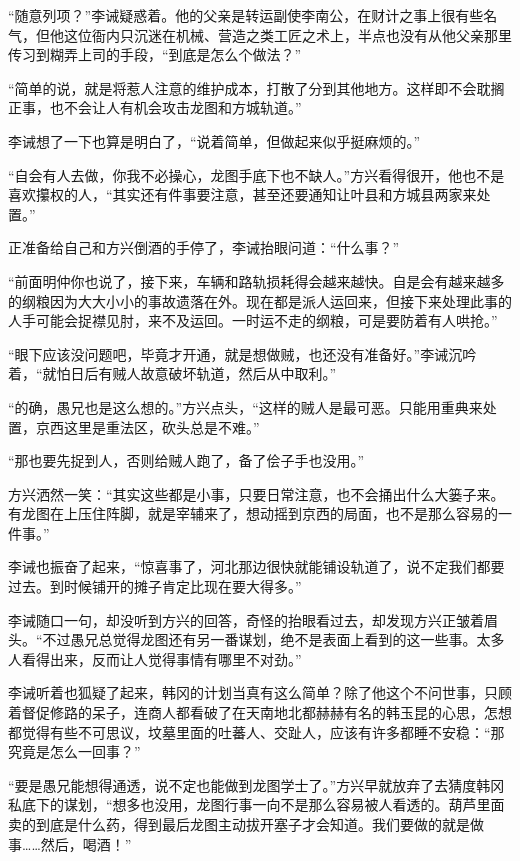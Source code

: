 “随意列项？”李诫疑惑着。他的父亲是转运副使李南公，在财计之事上很有些名气，但他这位衙内只沉迷在机械、营造之类工匠之术上，半点也没有从他父亲那里传习到糊弄上司的手段，“到底是怎么个做法？”

“简单的说，就是将惹人注意的维护成本，打散了分到其他地方。这样即不会耽搁正事，也不会让人有机会攻击龙图和方城轨道。”

李诫想了一下也算是明白了，“说着简单，但做起来似乎挺麻烦的。”

“自会有人去做，你我不必操心，龙图手底下也不缺人。”方兴看得很开，他也不是喜欢攥权的人，“其实还有件事要注意，甚至还要通知让叶县和方城县两家来处置。”

正准备给自己和方兴倒酒的手停了，李诫抬眼问道：“什么事？”

“前面明仲你也说了，接下来，车辆和路轨损耗得会越来越快。自是会有越来越多的纲粮因为大大小小的事故遗落在外。现在都是派人运回来，但接下来处理此事的人手可能会捉襟见肘，来不及运回。一时运不走的纲粮，可是要防着有人哄抢。”

“眼下应该没问题吧，毕竟才开通，就是想做贼，也还没有准备好。”李诫沉吟着，“就怕日后有贼人故意破坏轨道，然后从中取利。”

“的确，愚兄也是这么想的。”方兴点头，“这样的贼人是最可恶。只能用重典来处置，京西这里是重法区，砍头总是不难。”

“那也要先捉到人，否则给贼人跑了，备了侩子手也没用。”

方兴洒然一笑：“其实这些都是小事，只要日常注意，也不会捅出什么大篓子来。有龙图在上压住阵脚，就是宰辅来了，想动摇到京西的局面，也不是那么容易的一件事。”

李诫也振奋了起来，“惊喜事了，河北那边很快就能铺设轨道了，说不定我们都要过去。到时候铺开的摊子肯定比现在要大得多。”

李诫随口一句，却没听到方兴的回答，奇怪的抬眼看过去，却发现方兴正皱着眉头。“不过愚兄总觉得龙图还有另一番谋划，绝不是表面上看到的这一些事。太多人看得出来，反而让人觉得事情有哪里不对劲。”

李诫听着也狐疑了起来，韩冈的计划当真有这么简单？除了他这个不问世事，只顾着督促修路的呆子，连商人都看破了在天南地北都赫赫有名的韩玉昆的心思，怎想都觉得有些不可思议，坟墓里面的吐蕃人、交趾人，应该有许多都睡不安稳：“那究竟是怎么一回事？”

“要是愚兄能想得通透，说不定也能做到龙图学士了。”方兴早就放弃了去猜度韩冈私底下的谋划，“想多也没用，龙图行事一向不是那么容易被人看透的。葫芦里面卖的到底是什么药，得到最后龙图主动拔开塞子才会知道。我们要做的就是做事……然后，喝酒！”

